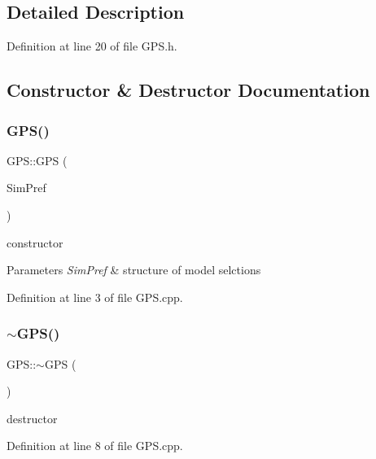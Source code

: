 \subsection{Detailed Description}


Definition at line 20 of file G\+P\+S.\+h.



\subsection{Constructor \& Destructor Documentation}
\mbox{\label{class_g_p_s_a534c0227b2c8af802aa9ef100a123210}} 
\subsubsection{\texorpdfstring{G\+P\+S()}{GPS()}}
{\footnotesize\ttfamily G\+P\+S\+::\+G\+PS (\begin{DoxyParamCaption}\item[{Sim\+D\+Preference \&}]{Sim\+Pref }\end{DoxyParamCaption})}



constructor 


\begin{DoxyParams}{Parameters}
{\em Sim\+Pref} & structure of model selctions \\
\hline
\end{DoxyParams}


Definition at line 3 of file G\+P\+S.\+cpp.

\mbox{\label{class_g_p_s_afe84b00ea93254fcb8b84a0f2b240c9d}} 
\subsubsection{\texorpdfstring{$\sim$\+G\+P\+S()}{~GPS()}}
{\footnotesize\ttfamily G\+P\+S\+::$\sim$\+G\+PS (\begin{DoxyParamCaption}{ }\end{DoxyParamCaption})}



destructor 



Definition at line 8 of file G\+P\+S.\+cpp.



